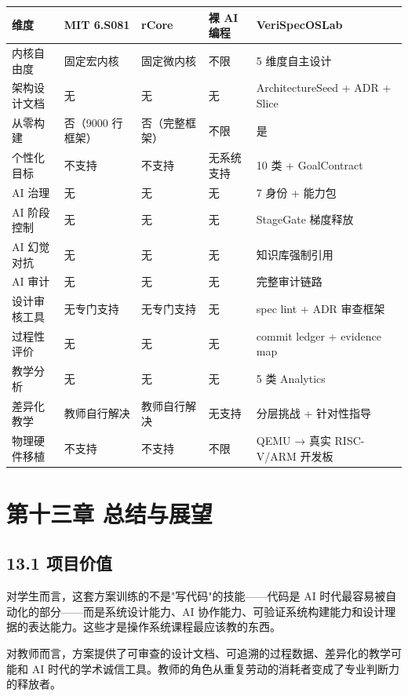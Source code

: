 \documentclass[UTF8,a4paper,12pt,openany]{ctexrep}
\begin{document}
{\def\LTcaptype{none} %
\begin{longtable}{@{}Y{0.17\textwidth}Y{0.13\textwidth}Y{0.13\textwidth}Y{0.13\textwidth}Y{0.31\textwidth}@{}}
\toprule\noalign{}
维度 & MIT 6.S081 & rCore & 裸 AI 编程 & VeriSpecOSLab \\
\midrule\noalign{}
\endhead
\bottomrule\noalign{}
\endlastfoot
内核自由度 & 固定宏内核 & 固定微内核 & 不限 & 5 维度自主设计 \\
架构设计文档 & 无 & 无 & 无 & ArchitectureSeed + ADR + Slice \\
从零构建 & 否（9000 行框架） & 否（完整框架） & 不限 & 是 \\
个性化目标 & 不支持 & 不支持 & 无系统支持 & 10 类 + GoalContract \\
AI 治理 & 无 & 无 & 无 & 7 身份 + 能力包 \\
AI 阶段控制 & 无 & 无 & 无 & StageGate 梯度释放 \\
AI 幻觉对抗 & 无 & 无 & 无 & 知识库强制引用 \\
AI 审计 & 无 & 无 & 无 & 完整审计链路 \\
设计审核工具 & 无专门支持 & 无专门支持 & 无 & spec lint + ADR 审查框架 \\
过程性评价 & 无 & 无 & 无 & commit ledger + evidence map \\
教学分析 & 无 & 无 & 无 & 5 类 Analytics \\
差异化教学 & 教师自行解决 & 教师自行解决 & 无支持 & 分层挑战 + 针对性指导 \\
物理硬件移植 & 不支持 & 不支持 & 不限 & QEMU → 真实 RISC-V/ARM 开发板 \\
\end{longtable}
}


\chapter{第十三章 总结与展望}\label{ux7b2cux5341ux4e09ux7ae0-ux603bux7ed3ux4e0eux5c55ux671b}

\section{13.1 项目价值}\label{131-ux9879ux76eeux4ef7ux503c}

对学生而言，这套方案训练的不是"写代码"的技能------代码是 AI 时代最容易被自动化的部分------而是系统设计能力、AI 协作能力、可验证系统构建能力和设计理据的表达能力。这些才是操作系统课程最应该教的东西。

对教师而言，方案提供了可审查的设计文档、可追溯的过程数据、差异化的教学可能和 AI 时代的学术诚信工具。教师的角色从重复劳动的消耗者变成了专业判断力的释放者。
\end{document}
